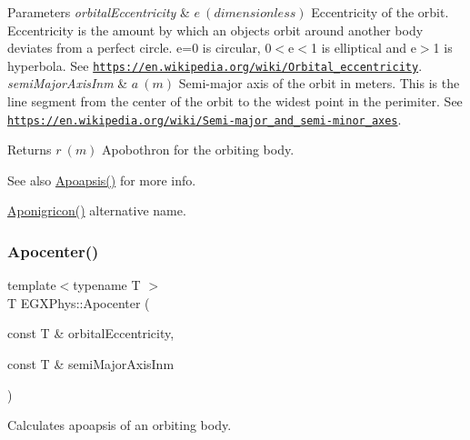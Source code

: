 \begin{DoxyParams}{Parameters}
{\em orbital\+Eccentricity} & $ e\ (dimensionless)$ Eccentricity of the orbit. Eccentricity is the amount by which an objects orbit around another body deviates from a perfect circle. e=0 is circular, 0$<$e$<$1 is elliptical and e$>$1 is hyperbola. See \href{https://en.wikipedia.org/wiki/Orbital_eccentricity}{\tt https\+://en.\+wikipedia.\+org/wiki/\+Orbital\+\_\+eccentricity}. \\
\hline
{\em semi\+Major\+Axis\+Inm} & $ a\ (m)$ Semi-\/major axis of the orbit in meters. This is the line segment from the center of the orbit to the widest point in the perimiter. See \href{https://en.wikipedia.org/wiki/Semi-major_and_semi-minor_axes}{\tt https\+://en.\+wikipedia.\+org/wiki/\+Semi-\/major\+\_\+and\+\_\+semi-\/minor\+\_\+axes}. \\
\hline
\end{DoxyParams}
\begin{DoxyReturn}{Returns}
$ r\ (m)$ Apobothron for the orbiting body. 
\end{DoxyReturn}
\begin{DoxySeeAlso}{See also}
\mbox{\hyperlink{group___e_g_x_phys-_apoapsis_gafd08a2d1d64886e7bb9bcb7ff65bc3ea}{Apoapsis()}} for more info. 

\mbox{\hyperlink{group___e_g_x_phys-_apoapsis_gabceed387c4cdd53b8ccebafe2e8da8e1}{Aponigricon()}} alternative name. 
\end{DoxySeeAlso}
\mbox{\label{group___e_g_x_phys-_apoapsis_gaacffba78614c5b4d5488d8e9b8c661ee}} 
\subsubsection{\texorpdfstring{Apocenter()}{Apocenter()}}
{\footnotesize\ttfamily template$<$typename T $>$ \\
T E\+G\+X\+Phys\+::\+Apocenter (\begin{DoxyParamCaption}\item[{const T \&}]{orbital\+Eccentricity,  }\item[{const T \&}]{semi\+Major\+Axis\+Inm }\end{DoxyParamCaption})}



Calculates apoapsis of an orbiting body. 


